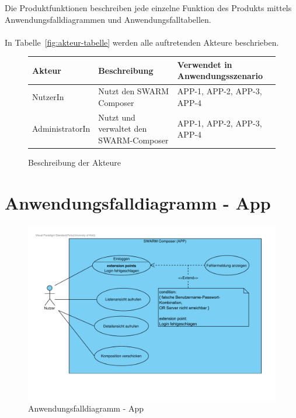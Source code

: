 Die Produktfunktionen beschreiben jede einzelne Funktion des Produkts mittels Anwendungsfalldiagrammen und Anwendungsfalltabellen.
\\\\
In  Tabelle~\autoref{fig:akteur-tabelle} werden alle auftretenden Akteure beschrieben.


\begin{figure}[h]
	\centering
	
	\begin{tabularx}{\textwidth}{ p{} | p{} | X }
		\textbf{Akteur} & \textbf{Beschreibung} & \textbf{Verwendet in Anwendungsszenario} \\ \hline
		NutzerIn & Nutzt den SWARM Composer & APP-1, APP-2, APP-3, APP-4
		\\ \hline AdministratorIn & Nutzt und verwaltet den SWARM-Composer & APP-1, APP-2, APP-3, APP-4
	\end{tabularx}
	
	\caption{Beschreibung der Akteure}
	\label{fig:akteur-tabelle}
\end{figure}


\newpage

\section{Anwendungsfalldiagramm - App}

\begin{figure}[h]
	\centering	
	\includegraphics[width=\textwidth]{img/Produktfunktionen_app}	
	\caption{Anwendungsfalldiagramm - App}
	\label{fig:anwendungsfalldiagramm-app}
\end{figure}

